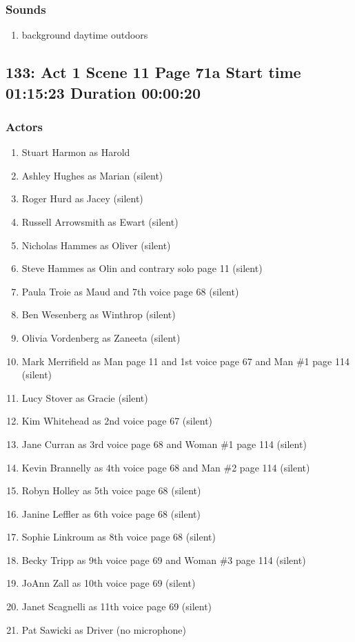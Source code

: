 \subsubsection{Sounds}
\begin{enumerate}
\item background daytime outdoors
\end{enumerate}
\subsection{133: Act 1 Scene 11 Page 71a Start time 01:15:23 Duration 00:00:20}

\subsubsection{Actors}
\begin{enumerate}
\item Stuart Harmon as Harold
\item Ashley Hughes as Marian (silent)
\item Roger Hurd as Jacey (silent)
\item Russell Arrowsmith as Ewart (silent)
\item Nicholas Hammes as Oliver (silent)
\item Steve Hammes as Olin and contrary solo page 11 (silent)
\item Paula Troie as Maud and 7th voice page 68 (silent)
\item Ben Wesenberg as Winthrop (silent)
\item Olivia Vordenberg as Zaneeta (silent)
\item Mark Merrifield as Man page 11 and 1st voice page 67 and Man \#1 page 114 (silent)
\item Lucy Stover as Gracie (silent)
\item Kim Whitehead as 2nd voice page 67 (silent)
\item Jane Curran as 3rd voice page 68 and Woman \#1 page 114 (silent)
\item Kevin Brannelly as 4th voice page 68 and Man \#2 page 114 (silent)
\item Robyn Holley as 5th voice page 68 (silent)
\item Janine Leffler as 6th voice page 68 (silent)
\item Sophie Linkroum as 8th voice page 68 (silent)
\item Becky Tripp as 9th voice page 69 and Woman \#3 page 114 (silent)
\item JoAnn Zall as 10th voice page 69 (silent)
\item Janet Scagnelli as 11th voice page 69 (silent)
\item Pat Sawicki as Driver (no microphone)
\end{enumerate}

